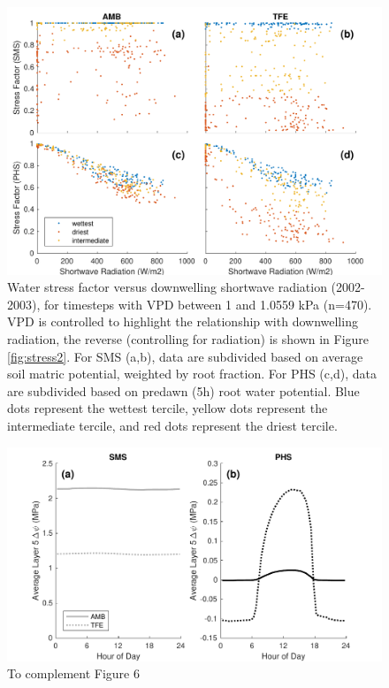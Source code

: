 \documentclass[draft,linenumbers]{agujournal}
\begin{document}
      \begin{figure}[h]
     \centering
     \includegraphics[width=30pc]{../figs3/suppstress.pdf}
     \caption{Water stress factor versus downwelling shortwave radiation (2002-2003), for timesteps with VPD between 1 and 1.0559 kPa (n=470).
     VPD is controlled to highlight the relationship with downwelling radiation, the reverse (controlling for radiation) is shown in Figure \ref{fig:stress2}.
     For SMS (a,b), data are subdivided based on average soil matric potential, weighted by root fraction.
     For PHS (c,d), data are subdivided based on predawn (5h) root water potential.
     Blue dots represent the wettest tercile, yellow dots represent the intermediate tercile, and red dots represent the driest tercile.
     }
     \label{supp:fsds}
       \end{figure}

 

        \begin{figure}[h]
     \centering
     \includegraphics[width=30pc]{../figs3/suppdp.pdf}
     \caption{To complement Figure 6}
     \label{supp:cond}
  \end{figure}
  \clearpage
  
\end{document}
